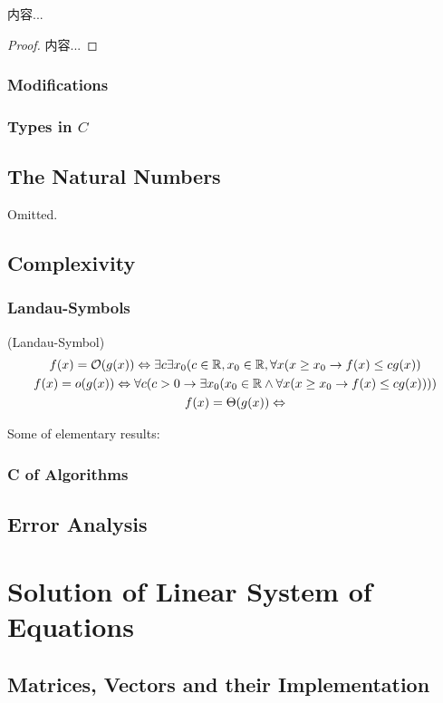 \documentclass[Total.tex]{subfiles}
\begin{document}
			\begin{corollary}
				内容...
			\end{corollary}
			\begin{proof}
				内容...
			\end{proof}
			\subsection{Modifications}
			\subsection{Types in $C$}
		\section{The Natural Numbers}
			Omitted.
		\section{Complexivity}
		
			\subsection{Landau-Symbols}
			\begin{Def}
				(Landau-Symbol)
				\begin{gather*}
					f(x)=\mathcal{O}(g(x))\Leftrightarrow \exists c\exists x_0(c\in \mathbb{R},x_0\in \mathbb{R},\forall x(x\geq x_0\rightarrow f(x)\leq cg(x))\\
					f(x)=o(g(x))\Leftrightarrow \forall c(c>0\rightarrow \exists x_0(x_0\in \mathbb{R}\wedge \forall x(x\geq x_0\rightarrow f(x)\leq cg(x))))\\
					f(x)=\Theta(g(x))\Leftrightarrow 
				\end{gather*}
			\end{Def}
			Some of elementary results:
			\subsection{C of Algorithms}
		\section{Error Analysis}
	\chapter{Solution of Linear System of Equations}
		\section{Matrices, Vectors and their Implementation}
\end{document}
